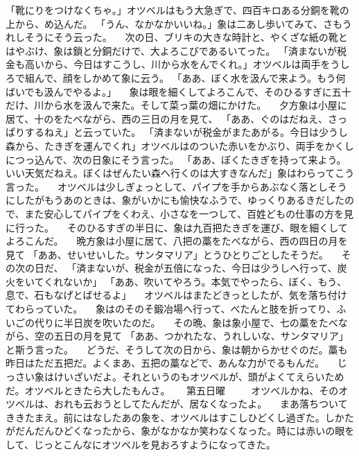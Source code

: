\documentclass[a5paper, twocolumn]{tbook}
\begin{document}
「靴にりをつけなくちゃ。」オツベルはもう大急ぎで、四百キロある分銅を靴の上から、め込んだ。
「うん、なかなかいいね。」象は二あし歩いてみて、さもうれしそうにそう云った。
　次の日、ブリキの大きな時計と、やくざな紙の靴とはやぶけ、象は鎖と分銅だけで、大よろこびであるいてった。
「済まないが税金も高いから、今日はすこうし、川から水をんでくれ。」オツベルは両手をうしろで組んで、顔をしかめて象に云う。
「ああ、ぼく水を汲んで来よう。もう何ばいでも汲んでやるよ。」
　象は眼を細くしてよろこんで、そのひるすぎに五十だけ、川から水を汲んで来た。そして菜っ葉の畑にかけた。
　夕方象は小屋に居て、十のをたべながら、西の三日の月を見て、
「ああ、ぐのはだねえ、さっぱりするねえ」と云っていた。
「済まないが税金がまたあがる。今日は少うし森から、たきぎを運んでくれ」オツベルはのついた赤いをかぶり、両手をかくしにつっ込んで、次の日象にそう言った。
「ああ、ぼくたきぎを持って来よう。いい天気だねえ。ぼくはぜんたい森へ行くのは大すきなんだ」象はわらってこう言った。
　オツベルは少しぎょっとして、パイプを手からあぶなく落としそうにしたがもうあのときは、象がいかにも愉快なふうで、ゆっくりあるきだしたので、また安心してパイプをくわえ、小さなを一つして、百姓どもの仕事の方を見に行った。
　そのひるすぎの半日に、象は九百把たきぎを運び、眼を細くしてよろこんだ。
　晩方象は小屋に居て、八把の藁をたべながら、西の四日の月を見て
「ああ、せいせいした。サンタマリア」とうひとりごとしたそうだ。
　その次の日だ、
「済まないが、税金が五倍になった、今日は少うしへ行って、炭火をいてくれないか」
「ああ、吹いてやろう。本気でやったら、ぼく、もう、息で、石もなげとばせるよ」
　オツベルはまたどきっとしたが、気を落ち付けてわらっていた。
　象はのそのそ鍛冶場へ行って、べたんと肢を折ってり、ふいごの代りに半日炭を吹いたのだ。
　その晩、象は象小屋で、七の藁をたべながら、空の五日の月を見て
「ああ、つかれたな、うれしいな、サンタマリア」と斯う言った。
　どうだ、そうして次の日から、象は朝からかせぐのだ。藁も昨日はただ五把だ。よくまあ、五把の藁などで、あんな力がでるもんだ。
　じっさい象はけいざいだよ。それというのもオツベルが、頭がよくてえらいためだ。オツベルときたら大したもんさ。
　
第五日曜
　
　オツベルかね、そのオツベルは、おれも云おうとしてたんだが、居なくなったよ。
　まあ落ちついてききたまえ。前にはなしたあの象を、オツベルはすこしひどくし過ぎた。しかたがだんだんひどくなったから、象がなかなか笑わなくなった。時には赤いの眼をして、じっとこんなにオツベルを見おろすようになってきた。
\end{document}

